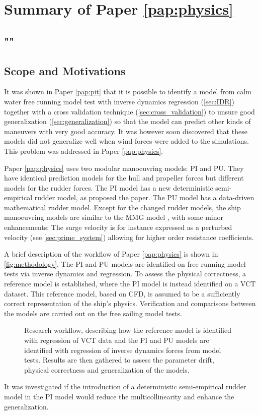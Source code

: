 \section{Summary of Paper \ref{pap:physics}}
\subsection*{""}
\subsection*{Scope and Motivations}
It was shown in Paper \ref{pap:pit} that it is possible to identify a model from calm water free running model test with inverse dynamics regression (\autoref{sec:IDR}) together with a cross validation technique (\autoref{sec:cross_validation}) to unsure good generalization (\autoref{sec:generalization}) so that the model can predict other kinds of maneuvers with very good accuracy. It was however soon discovered that these models did not generalize well when wind forces were added to the simulations. This problem was addressed in Paper \ref{pap:physics}.

Paper \ref{pap:physics} uses two modular manoeuvring models: PI and PU. They have identical prediction models for the hull and propeller forces but different models for the rudder forces. The PI model has a new deterministic semi-empirical rudder model, as proposed the paper. The PU model has a data-driven mathematical rudder model. Except for the changed rudder models, the ship manoeuvring models are similar to the MMG model \cite{yasukawa_introduction_2015}, with some minor enhancements; The surge velocity is for instance expressed as a perturbed velocity (see \autoref{sec:prime_system}) allowing for higher order resistance coefficients.

A brief description of the workflow of Paper \ref{pap:physics} is shown in \autoref{fig:methodology}.
The PI and PU models are identified on free running model tests via inverse dynamics and regression. To assess the physical correctness, a reference model is established, where the PI model is instead identified on a VCT dataset. This reference model, based on CFD, is assumed to be a sufficiently correct representation of the ship's physics.
Verification and comparisons between the models are carried out on the free sailing model tests.
\begin{figure}[h]
  \centering
  
  \caption{Research workflow, describing how the reference model is identified with regression of VCT data and the PI and PU models are identified with regression of inverse dynamics forces from model tests. Results are then gathered to assess the parameter drift, physical correctness and generalization of the models.}
  \label{fig:methodology}
\end{figure}
It was investigated if the introduction of a deterministic semi-empirical rudder model in the PI model would reduce the multicollinearity and enhance the generalization.
